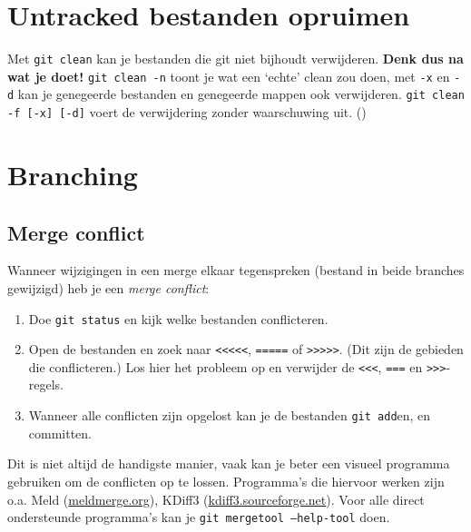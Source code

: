 \documentclass[9pt,a4paper]{extarticle}
\newcommand{\shell}[1]{\texttt{#1}}
\begin{document}
\section*{Untracked bestanden opruimen}
Met \shell{git clean} kan je bestanden die git niet bijhoudt verwijderen. \textbf{Denk dus na wat je doet!} \shell{git
clean -n} toont je wat een `echte' clean zou doen, met \shell{-x} en \shell{-d} kan je genegeerde bestanden en
genegeerde mappen ook verwijderen. \shell{git clean -f [-x] [-d]} voert de verwijdering zonder waarschuwing uit.
(\danger{})

\section*{Branching}
\settowidth{\OptieBreed}{\shell{git checkout --no-merged }}

\subsection*{Merge conflict}
Wanneer wijzigingen in een merge elkaar tegenspreken (bestand in beide branches gewijzigd) heb je een \emph{merge conflict}:
\begin{enumerate}
	\item Doe \shell{git status} en kijk welke bestanden conflicteren.
	\item Open de bestanden en zoek naar \shell{<<<<<}, \shell{=====} of \shell{>>>>>}. (Dit zijn de gebieden die
		conflicteren.) Los hier het probleem op en verwijder de \shell{<<<}, \shell{===} en \shell{>>>}-regels.
	\item Wanneer alle conflicten zijn opgelost kan je de bestanden \shell{git add}en, en committen.
\end{enumerate}
Dit is niet altijd de handigste manier, vaak kan je beter een visueel programma gebruiken om de conflicten op te lossen.
Programma's die hiervoor werken zijn o.a. Meld (\url{meldmerge.org}), KDiff3 (\url{kdiff3.sourceforge.net}). Voor alle
direct ondersteunde programma's kan je \shell{git mergetool --help-tool} doen.
\end{document}
